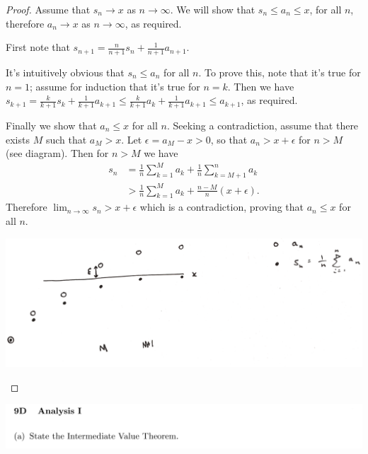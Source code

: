 \documentclass[12pt]{article}
\begin{document}
\begin{proof}
  Assume that $s_n \to x$ as $n \to \infty$. We will show that $s_n \leq a_n \leq x$, for all $n$,
  therefore $a_n \to x$ as $n \to \infty$, as required.

  First note that $s_{n+1} = \frac{n}{n+1}s_n + \frac{1}{n+1}a_{n+1}$.

  It's intuitively obvious that $s_n \leq a_n$ for all $n$. To prove this, note that it's true for
  $n = 1$; assume for induction that it's true for $n = k$. Then we have
  $s_{k+1} = \frac{k}{k+1}s_k + \frac{1}{k+1}a_{k+1} \leq \frac{k}{k+1}a_k + \frac{1}{k+1}a_{k+1}
  \leq a_{k+1}$, as required.

  Finally we show that $a_n \leq x$ for all $n$. Seeking a contradiction, assume that there exists
  $M$ such that $a_M > x$. Let $\epsilon = a_M - x > 0$, so that $a_n > x + \epsilon$ for $n > M$
  (see diagram). Then for $n > M$ we have
  \begin{align*}
    s_n &= \frac{1}{n}\sum_{k=1}^M a_k + \frac{1}{n}\sum_{k=M+1}^n a_k\\
        &> \frac{1}{n}\sum_{k=1}^M a_k + \frac{n - M}{n}(x + \epsilon).
  \end{align*}
  Therefore $\lim_{n\to\infty}s_n > x + \epsilon$ which is a contradiction, proving that
  $a_n \leq x$ for all $n$.
\begin{mdframed}
\includegraphics[width=400pt]{img/misc--cambridge-1a-2017-1-3f-diagram.png}
\end{mdframed}
\end{proof}



\begin{mdframed}
\includegraphics[width=400pt]{img/misc--cambridge-1a-2017-1-9D-1.png}
\end{mdframed}
\end{document}
